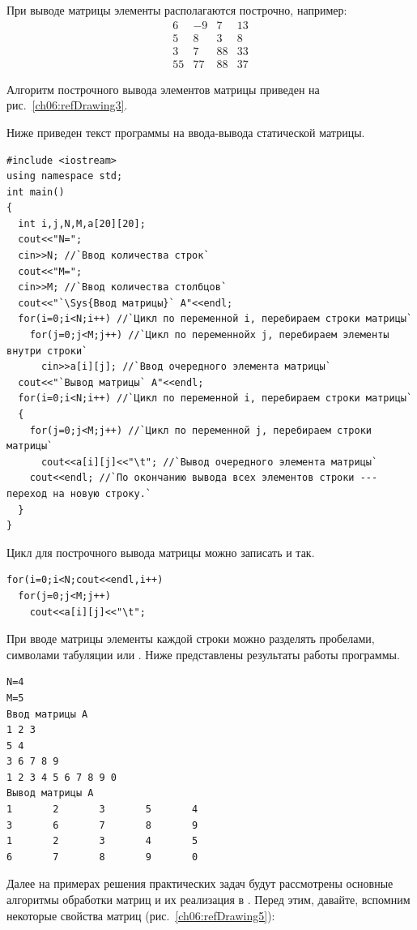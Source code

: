 При выводе матрицы элементы располагаются построчно, например:
$$\begin{matrix}6&-9&7&13\\5&8&3&8\\3&7&88&33\\55&77&88&37\end{matrix}$$

Алгоритм построчного вывода элементов матрицы приведен на рис.~\ref{ch06:refDrawing3}.


Ниже приведен текст программы на  ввода-вывода статической матрицы.
\begin{lstlisting}
#include <iostream>
using namespace std;
int main()
{
  int i,j,N,M,a[20][20];
  cout<<"N=";
  cin>>N; //`Ввод количества строк`
  cout<<"M=";
  cin>>M; //`Ввод количества столбцов`
  cout<<"`\Sys{Ввод матрицы}` A"<<endl;
  for(i=0;i<N;i++) //`Цикл по переменной i, перебираем строки матрицы`
    for(j=0;j<M;j++) //`Цикл по переменнойx j, перебираем элементы внутри строки`
      cin>>a[i][j]; //`Ввод очередного элемента матрицы`
  cout<<"`Вывод матрицы` A"<<endl;
  for(i=0;i<N;i++) //`Цикл по переменной i, перебираем строки матрицы`
  {
    for(j=0;j<M;j++) //`Цикл по переменной j, перебираем строки матрицы`
      cout<<a[i][j]<<"\t"; //`Вывод очередного элемента матрицы`
    cout<<endl; //`По окончанию вывода всех элементов строки --- переход на новую строку.`
  }
}
\end{lstlisting}

Цикл для построчного вывода матрицы можно записать и так.
\begin{lstlisting}
for(i=0;i<N;cout<<endl,i++)
  for(j=0;j<M;j++)
    cout<<a[i][j]<<"\t";
\end{lstlisting}
При вводе матрицы элементы каждой строки можно разделять пробелами, символами табуляции или
.
Ниже 
представлены результаты работы программы.
\begin{verbatim}
N=4
M=5
Ввод матрицы A
1 2 3
5 4
3 6 7 8 9
1 2 3 4 5 6 7 8 9 0
Вывод матрицы A
1       2       3       5       4	
3       6       7       8       9	
1       2       3       4       5	
6       7       8       9       0
\end{verbatim}

Далее на примерах решения практических задач будут рассмотрены основные алгоритмы обработки матриц и их реализация в
. Перед этим, давайте, вспомним некоторые свойства матриц (рис.~\ref{ch06:refDrawing5}):

